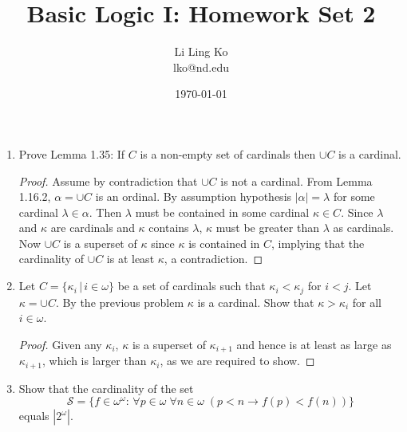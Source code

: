 \documentclass{article}
\begin{document}
\title{Basic Logic I: Homework Set 2}
\author{Li Ling Ko\\ lko@nd.edu}
\date{\today}
\maketitle

\begin{enumerate}
  \item Prove Lemma 1.35: If $C$ is a non-empty set of cardinals then
    $\cup C$ is a cardinal.

    \begin{proof}
      Assume by contradiction that $\cup C$ is not a cardinal. 
      From Lemma 1.16.2, $\alpha=\cup C$ is an ordinal. By assumption
      hypothesis $|\alpha|=\lambda$ for some cardinal $\lambda\in\alpha$.
      Then $\lambda$ must be contained in some cardinal $\kappa\in C$.
      Since $\lambda$ and $\kappa$ are cardinals and $\kappa$ contains
      $\lambda$, $\kappa$ must be greater than $\lambda$ as cardinals. Now
      $\cup C$ is a superset of $\kappa$ since $\kappa$ is contained in
      $C$, implying that the cardinality of $\cup C$ is at least $\kappa$,
      a contradiction.
    \end{proof}

  \item Let $C=\{\kappa_i\,|\, i\in\omega\}$ be a set of cardinals such
    that $\kappa_i<\kappa_j$ for $i<j$. Let $\kappa=\cup C$. By the
    previous problem $\kappa$ is a cardinal. Show that $\kappa>\kappa_i$
    for all $i\in\omega$.

    \begin{proof}
      Given any $\kappa_i$, $\kappa$ is a superset of $\kappa_{i+1}$ and
      hence is at least as large as $\kappa_{i+1}$, which is larger than
      $\kappa_i$, as we are required to show.
    \end{proof}

  \item Show that the cardinality of the set
    \begin{equation*}
      \mathcal{S}=\{f\in\omega^\omega:\, \forall p\in\omega\; \forall
      n\in\omega\; (p<n\rightarrow f(p)<f(n))\}
    \end{equation*}
    equals $|2^\omega|$.


\end{enumerate}
\end{document}

